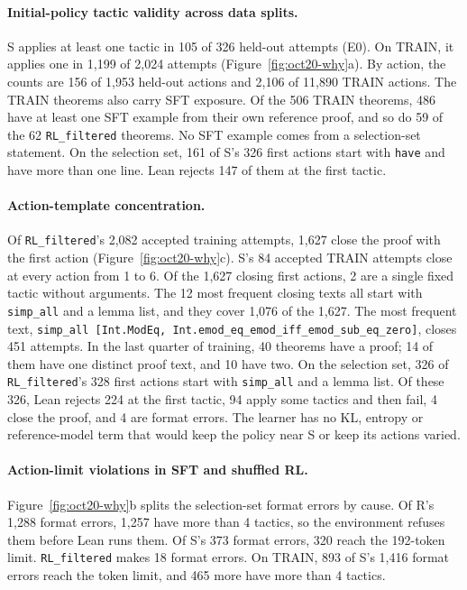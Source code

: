 \documentclass[11pt]{article}
\newcommand{\code}[1]{\texttt{#1}}
\begin{document}
\paragraph{Initial-policy tactic validity across data splits.}
S applies at least one tactic in 105 of 326 held-out attempts (E0).
On TRAIN, it applies one in 1,199 of 2,024 attempts (Figure~\ref{fig:oct20-why}a).
By action, the counts are 156 of 1,953 held-out actions and 2,106 of 11,890 TRAIN actions.
The TRAIN theorems also carry SFT exposure.
Of the 506 TRAIN theorems, 486 have at least one SFT example from their own reference proof, and so do 59 of the 62 \code{RL\_filtered} theorems.
No SFT example comes from a selection-set statement.
On the selection set, 161 of S's 326 first actions start with \code{have} and have more than one line.
Lean rejects 147 of them at the first tactic.

\paragraph{Action-template concentration.}
Of \code{RL\_filtered}'s 2,082 accepted training attempts, 1,627 close the proof with the first action (Figure~\ref{fig:oct20-why}c).
S's 84 accepted TRAIN attempts close at every action from 1 to 6.
Of the 1,627 closing first actions, 2 are a single fixed tactic without arguments.
The 12 most frequent closing texts all start with \code{simp\_all} and a lemma list, and they cover 1,076 of the 1,627.
The most frequent text, \code{simp\_all [Int.ModEq, Int.emod\_eq\_emod\_iff\_emod\_sub\_eq\_zero]}, closes 451 attempts.
In the last quarter of training, 40 theorems have a proof; 14 of them have one distinct proof text, and 10 have two.
On the selection set, 326 of \code{RL\_filtered}'s 328 first actions start with \code{simp\_all} and a lemma list.
Of these 326, Lean rejects 224 at the first tactic, 94 apply some tactics and then fail, 4 close the proof, and 4 are format errors.
The learner has no KL, entropy or reference-model term that would keep the policy near S or keep its actions varied.

\paragraph{Action-limit violations in SFT and shuffled RL.}
Figure~\ref{fig:oct20-why}b splits the selection-set format errors by cause.
Of R's 1,288 format errors, 1,257 have more than 4 tactics, so the environment refuses them before Lean runs them.
Of S's 373 format errors, 320 reach the 192-token limit.
\code{RL\_filtered} makes 18 format errors.
On TRAIN, 893 of S's 1,416 format errors reach the token limit, and 465 more have more than 4 tactics.
\end{document}
